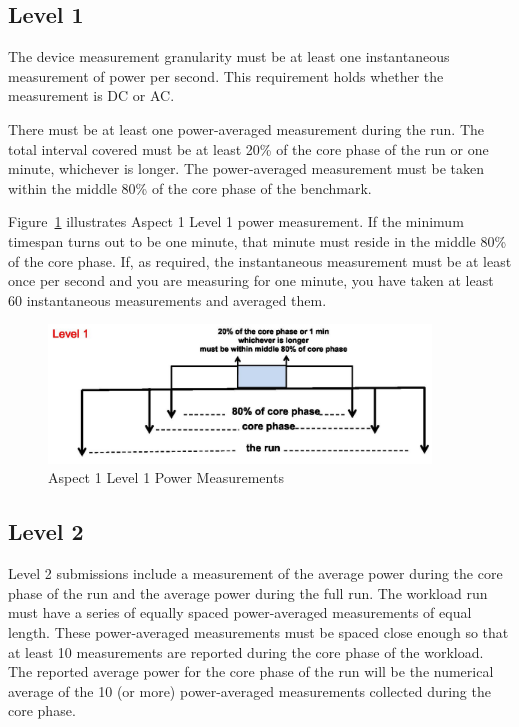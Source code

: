 \subsection{Level 1}
\noindent
The device measurement granularity must be at least one instantaneous measurement of power per second. This requirement holds whether the measurement is DC or AC.
\wl

\noindent
There must be at least one power-averaged measurement during the run.
The total interval covered must be at least 20\% of the core phase of the run or one minute, whichever is longer. The power-averaged measurement must be taken within the middle 80\% of the core phase of the benchmark.  
\wl

\noindent
Figure~\ref{fig:a1l1pm} illustrates Aspect 1 Level 1 power measurement. If the minimum timespan turns out to be one minute, that minute must reside in the middle 80\% of the core phase. If, as required, the instantaneous measurement must be at least once per second and you are measuring for one minute, you have taken at least 60 instantaneous measurements and averaged them.

\begin{figure}
\centering
\includegraphics[width=4in]{fig3-3}
\caption{Aspect 1 Level 1 Power Measurements}
\label{fig:a1l1pm}
\end{figure}

\subsection{Level 2}
\noindent
Level 2 submissions include a measurement of the average power during the core phase of the run and the average power during the full run. The workload run must have a series of equally spaced power-averaged measurements of equal length. These power-averaged measurements must be spaced close enough so that at least 10 measurements are reported during the core phase of the workload. The reported average power for the core phase of the run will be the numerical average of the 10 (or more) power-averaged measurements collected during the core phase.  
\wl

